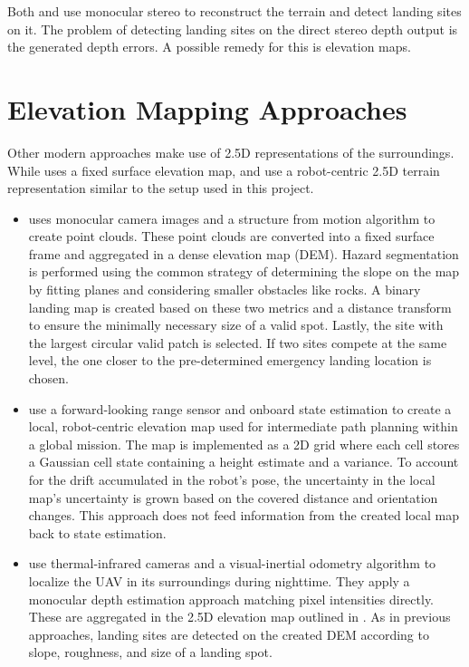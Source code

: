 Both \citep{Desaraju2015VisionBased} and \citep{Brockers2014TowardsAutonomous} use monocular stereo to reconstruct the terrain and detect landing sites on it. The problem of detecting landing sites on the direct stereo depth output is the generated depth errors. A possible remedy for this is elevation maps.

\section{Elevation Mapping Approaches}
 Other modern approaches make use of 2.5D representations of the surroundings. While \citep{Johnson2005VisionGuided} uses a fixed surface elevation map, \citep{Fankhauser2014RobotCentric} and \citep{Daftry2018Robust} use a robot-centric 2.5D terrain representation similar to the setup used in this project.

\begin{itemize}
    \item \citet{Johnson2005VisionGuided} uses monocular camera images and a structure from motion algorithm to create point clouds. These point clouds are converted into a fixed surface frame and aggregated in a dense elevation map (DEM). Hazard segmentation is performed using the common strategy of determining the slope on the map by fitting planes and considering smaller obstacles like rocks. A binary landing map is created based on these two metrics and a distance transform to ensure the minimally necessary size of a valid spot. Lastly, the site with the largest circular valid patch is selected. If two sites compete at the same level, the one closer to the pre-determined emergency landing location is chosen.
    \item \citet{Fankhauser2014RobotCentric} use a forward-looking range sensor and onboard state estimation to create a local, robot-centric elevation map used for intermediate path planning within a global mission. The map is implemented as a 2D grid where each cell stores a Gaussian cell state containing a height estimate and a variance. To account for the drift accumulated in the robot's pose, the uncertainty in the local map's uncertainty is grown based on the covered distance and orientation changes. This approach does not feed information from the created local map back to state estimation.
    \item \citet{Daftry2018Robust} use thermal-infrared cameras and a visual-inertial odometry algorithm to localize the UAV in its surroundings during nighttime. They apply a monocular depth estimation approach matching pixel intensities directly. These are aggregated in the 2.5D elevation map outlined in \citep{Fankhauser2014RobotCentric}. As in previous approaches, landing sites are detected on the created DEM according to slope, roughness, and size of a landing spot.
\end{itemize}


